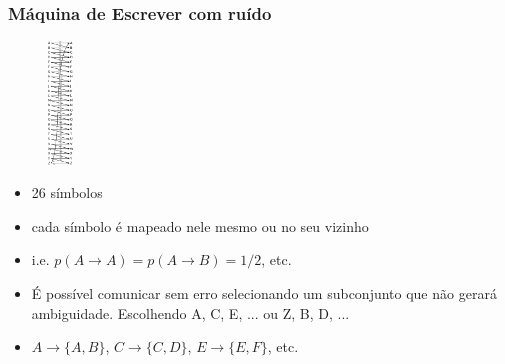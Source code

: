 \begin{frame}[allowframebreaks]
  \frametitle{Máquina de Escrever com ruído}
                \begin{figure}[h!]
                \centering
                \includegraphics[width=0.06\textwidth]{images/ntype.pdf}
                \label{fig:ntype}
                \end{figure}

  \begin{itemize}
  \item 26 símbolos
  \item cada símbolo é mapeado nele mesmo ou no seu vizinho
  \item i.e. $p(A \rightarrow A) = p(A \rightarrow B) = 1/2$, etc.
  \item É possível comunicar sem erro selecionando um subconjunto que não gerará ambiguidade.
	Escolhendo A, C, E, ... ou Z, B, D, ...
  \item $A \rightarrow \{A,B\}$, $C \rightarrow \{C,D\}$, $E \rightarrow \{E,F\}$, etc.


\end{itemize}
\end{frame}
